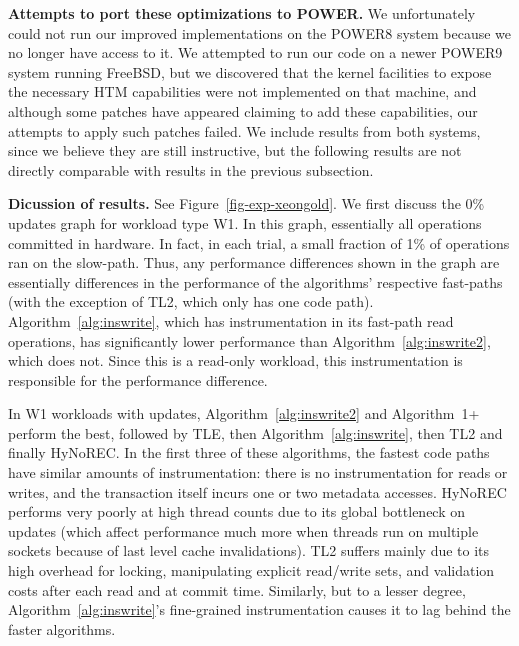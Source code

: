 \vspace{1mm}\noindent\textbf{Attempts to port these optimizations to POWER.}
We unfortunately could not run our improved implementations on the POWER8 system because we no longer have access to it.
We attempted to run our code on a newer POWER9 system running FreeBSD, but we discovered that the kernel facilities to expose the necessary HTM capabilities were not implemented on that machine, and although some patches have appeared claiming to add these capabilities, our attempts to apply such patches failed.
We include results from both systems, since we believe they are still instructive, but the following results are not directly comparable with results in the previous subsection.

\vspace{1mm}\noindent\textbf{Dicussion of results.}
See Figure~\ref{fig-exp-xeongold}.
We first discuss the 0\% updates graph for workload type W1.
In this graph, essentially all operations committed in hardware.
In fact, in each trial, a small fraction of 1\% of operations ran on the slow-path.
Thus, any performance differences shown in the graph are essentially differences in the performance of the algorithms' respective fast-paths (with the exception of TL2, which only has one code path).
Algorithm~\ref{alg:inswrite}, which has instrumentation in its fast-path read operations, has significantly lower performance than Algorithm~\ref{alg:inswrite2}, which does not.
Since this is a read-only workload, this instrumentation is responsible for the performance difference.

In W1 workloads with updates, Algorithm~\ref{alg:inswrite2} and Algorithm~1+ perform the best, followed by TLE, then Algorithm~\ref{alg:inswrite}, then TL2 and finally HyNoREC.
In the first three of these algorithms, the fastest code paths have similar amounts of instrumentation: there is no instrumentation for reads or writes, and the transaction itself incurs one or two metadata accesses.
HyNoREC performs very poorly at high thread counts due to its global bottleneck on updates (which affect performance much more when threads run on multiple sockets because of last level cache invalidations).
TL2 suffers mainly due to its high overhead for locking, manipulating explicit read/write sets, and validation costs after each read and at commit time.
Similarly, but to a lesser degree, Algorithm~\ref{alg:inswrite}'s fine-grained instrumentation causes it to lag behind the faster algorithms.

